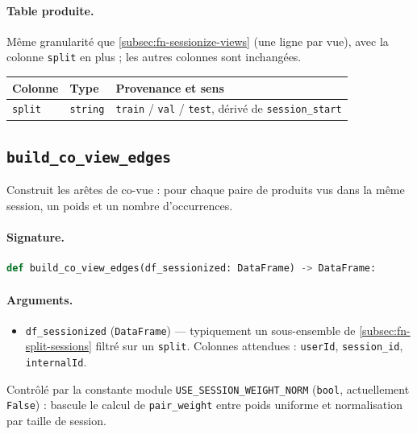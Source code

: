 \documentclass[11pt,a4paper]{article}
\newcommand{\code}[1]{\texttt{\small #1}}
\begin{document}
\paragraph{Table produite.}
Même granularité que \ref{subsec:fn-sessionize-views} (une ligne par vue), avec la
colonne \code{split} en plus ; les autres colonnes sont inchangées.
\begin{center}
\small
\begin{tabular}{@{}llp{6.8cm}@{}}
\toprule
\textbf{Colonne} & \textbf{Type} & \textbf{Provenance et sens} \\
\midrule
\code{split} & \code{string} & \code{train} / \code{val} / \code{test}, dérivé de \code{session\_start} \\
\bottomrule
\end{tabular}
\end{center}

\subsection{\texttt{build\_co\_view\_edges}}
\label{subsec:fn-build-co-view-edges}

Construit les arêtes de co-vue : pour chaque paire de produits vus dans la même
session, un poids et un nombre d'occurrences.

\paragraph{Signature.}\leavevmode\par
\begin{lstlisting}[language=Python]
def build_co_view_edges(df_sessionized: DataFrame) -> DataFrame:
\end{lstlisting}

\paragraph{Arguments.}
\begin{itemize}[nosep,leftmargin=*]
  \item \code{df\_sessionized} (\code{DataFrame}) --- typiquement un sous-ensemble de
        \ref{subsec:fn-split-sessions} filtré sur un \code{split}. Colonnes
        attendues : \code{userId}, \code{session\_id}, \code{internalId}.
\end{itemize}

\noindent Contrôlé par la constante module \code{USE\_SESSION\_WEIGHT\_NORM}
(\code{bool}, actuellement \code{False}) : bascule le calcul de \code{pair\_weight}
entre poids uniforme et normalisation par taille de session.
\end{document}

